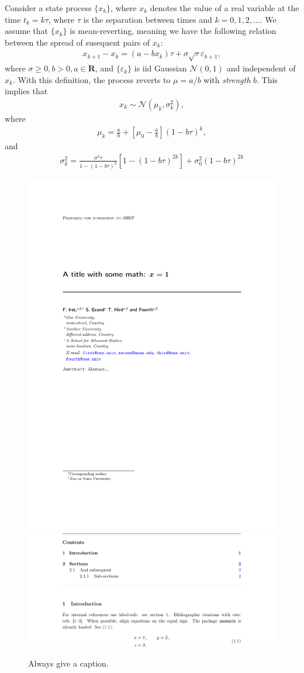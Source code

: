 \documentclass[a4paper,11pt]{article}
\begin{document}
Consider a state process $\{x_k\}$, where $x_k$ denotes the value of a real variable at the time $t_k = k \tau$, where $\tau$ is the separation between times and $k=0, 1, 2, \dots$. We assume that $\{ x_k \}$ is mean-reverting, meaning we have the following relation between the spread of susequent pairs of $x_k$:
%
\begin{align}
	x_{k+1} - x_k = (a-b x_k) \tau + \sigma \sqrt{\tau} \varepsilon_{k+1},
\end{align}
%
where $\sigma \geq 0, b > 0, a \in \mathbf{R}$, and $\{ \varepsilon_k \}$ is iid Gaussian $\mathcal{N}(0, 1)$ and independent of ${x_k}$. With this definition, the process reverts to $\mu = a/b$ with \textit{strength} $b$. This implies that
%
\begin{align}
	x_k \sim \mathcal{N}(\mu_k, \sigma_k^2),
\end{align}
%
where
%
\begin{align}
	\mu_k = \frac{a}{b} +\left[\mu_0 - \frac{a}{b} \right](1 - b \tau)^k,
\end{align}
%
and
%
\begin{align}
	\sigma_k^2 = \frac{\sigma^2 \tau}{1-(1-b \tau)^2} \left [ 1-(1-b\tau)^{2k} \right] + \sigma_0^2 (1-b \tau)^{2k}
\end{align}
%
\begin{figure}[tbp]
\centering %
\includegraphics[width=.45\textwidth,trim=0 380 0 200,clip]{img1.pdf}
\hfill
\includegraphics[width=.45\textwidth,origin=c,angle=180]{img2.pdf}
\caption{\label{fig:i} Always give a caption.}
\end{figure}
\end{document}
